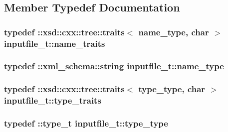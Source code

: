 \subsection{Member Typedef Documentation}
\hypertarget{classinputfile__t_a7d5c68e89634f1ebe16b33a42d43ea50}{
\subsubsection[{name\-\_\-traits}]{\setlength{\rightskip}{0pt plus 5cm}typedef \-::xsd\-::cxx\-::tree\-::traits$<$ {\bf name\-\_\-type}, char $>$ {\bf inputfile\-\_\-t\-::name\-\_\-traits}}}\label{classinputfile__t_a7d5c68e89634f1ebe16b33a42d43ea50}
\hypertarget{classinputfile__t_a78bf4131e7e2a433bfe95f85b2a5e1da}{
\subsubsection[{name\-\_\-type}]{\setlength{\rightskip}{0pt plus 5cm}typedef \-::{\bf xml\-\_\-schema\-::string} {\bf inputfile\-\_\-t\-::name\-\_\-type}}}\label{classinputfile__t_a78bf4131e7e2a433bfe95f85b2a5e1da}
\hypertarget{classinputfile__t_abcbf4050c7030f43da48c567d60444ae}{
\subsubsection[{type\-\_\-traits}]{\setlength{\rightskip}{0pt plus 5cm}typedef \-::xsd\-::cxx\-::tree\-::traits$<$ {\bf type\-\_\-type}, char $>$ {\bf inputfile\-\_\-t\-::type\-\_\-traits}}}\label{classinputfile__t_abcbf4050c7030f43da48c567d60444ae}
\hypertarget{classinputfile__t_a3f28e99146a586a8f55154818cdfe1ad}{
\subsubsection[{type\-\_\-type}]{\setlength{\rightskip}{0pt plus 5cm}typedef \-::{\bf type\-\_\-t} {\bf inputfile\-\_\-t\-::type\-\_\-type}}}\label{classinputfile__t_a3f28e99146a586a8f55154818cdfe1ad}


